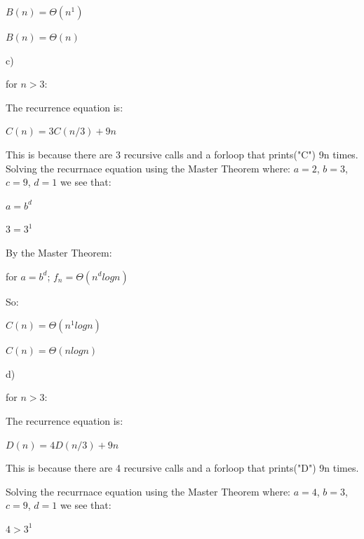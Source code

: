 \documentclass{article}
\begin{document}
\begin{solution}
$B(n) = \Theta(n^1)$
\newline

$B(n) = \Theta(n)$
\newline

c)
\newline

for $n > 3$:
\newline

The recurrence equation is:
\newline

$C(n) = 3C(n/3) + 9n$
\newline

This is because there are 3 recursive calls and a forloop that prints("C") 9n times.
\newline
\indent Solving the recurrnace equation using the Master Theorem where: $a=2$, $b=3$, $c=9$, $d=1$  we see that:
\newline

$a = b^d$
\newline

$3 = 3^1$
\newline

By the Master Theorem:
\newline

for $a=b^d$; $f_n = \Theta(n^d logn)$
\newline

So:
\newline

$C(n) = \Theta(n^1 logn)$
\newline

$C(n) = \Theta(nlogn)$
\newline

d)
\newline

for $n > 3$:
\newline

The recurrence equation is:
\newline

$D(n) = 4D(n/3) + 9n$
\newline

This is because there are 4 recursive calls and a forloop that prints("D") 9n times.
\newline

\indent Solving the recurrnace equation using the Master Theorem where: $a=4$, $b=3$, $c=9$, $d=1$  we see that:
\newline

$4 > 3^1$
\newline


\end{solution}
\end{document}
